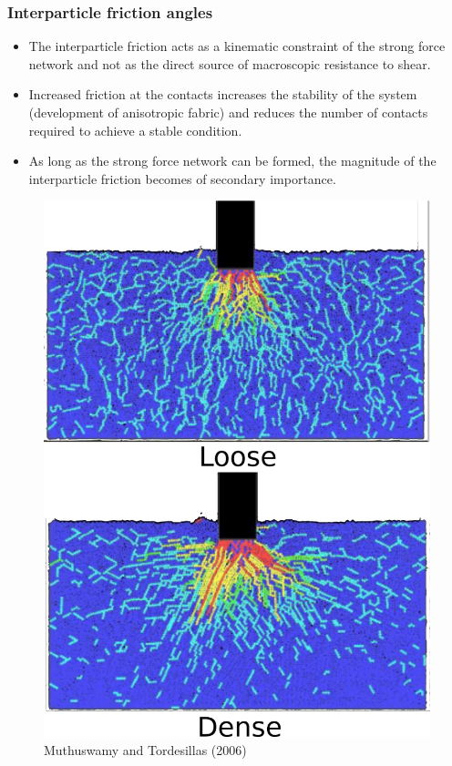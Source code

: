 \documentclass[notes]{beamer}
\begin{document}
\begin{frame}
	\frametitle{Interparticle friction angles}
	\noindent
	\fboxsep=0pt
	\noindent
	\begin{minipage}[t]{0.65\linewidth}
		\begin{itemize}
			\item The interparticle friction acts as a kinematic
			constraint of the strong force network and not as
			the direct source of macroscopic resistance to
			shear.
			\item Increased friction at the contacts increases the
			stability of the system (development of
			anisotropic fabric) and reduces the number of
			contacts required to achieve a stable condition.
			\item As long as the strong force network can be
			formed, the magnitude of the interparticle friction
			becomes of secondary importance.
		\end{itemize}
	\end{minipage}%
	\hfill
	\begin{minipage}[t]{0.35\linewidth}
		\begin{figure}
			\includegraphics[width=\textwidth]{figs/dem-force-chains-punch.png}
			\caption*{Muthuswamy and Tordesillas (2006)}
		\end{figure}
	\end{minipage}
\end{frame}
\end{document}
